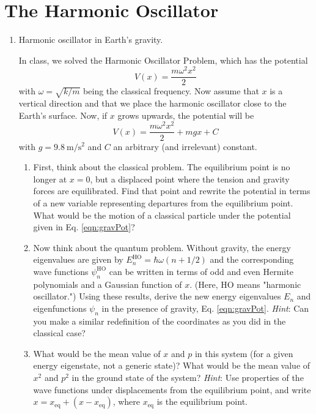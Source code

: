 \documentclass[../psets.tex]{subfiles}
\begin{document}
\section{The Harmonic Oscillator}
\begin{enumerate}
    \item {}Harmonic oscillator in Earth's gravity.\par
    In class, we solved the Harmonic Oscillator Problem, which has the potential
    \begin{equation}
        V(x) = \frac{m\omega^2x^2}{2}
    \end{equation}
    with $\omega=\sqrt{k/m}$ being the classical frequency. Now assume that $x$ is a vertical direction and that we place the harmonic oscillator close to the Earth's surface. Now, if $x$ grows upwards, the potential will be
    \begin{equation}\label{eqn:gravPot}
        V(x) = \frac{m\omega^2x^2}{2}+mgx+C
    \end{equation}
    with $g=\SI[per-mode=symbol]{9.8}{\meter\per\second\squared}$ and $C$ an arbitrary (and irrelevant) constant.
    \begin{enumerate}
        \item First, think about the classical problem. The equilibrium point is no longer at $x=0$, but a displaced point where the tension and gravity forces are equilibrated. Find that point and rewrite the potential in terms of a new variable representing departures from the equilibrium point. What would be the motion of a classical particle under the potential given in Eq. \ref{eqn:gravPot}?
        \item Now think about the quantum problem. Without gravity, the energy eigenvalues are given by $E_n^\text{HO}=\hbar\omega(n+1/2)$ and the corresponding wave functions $\psi_n^\text{HO}$ can be written in terms of odd and even Hermite polynomials and a Gaussian function of $x$. (Here, HO means "harmonic oscillator.") Using these results, derive the new energy eigenvalues $E_n$ and eigenfunctions $\psi_n$ in the presence of gravity, Eq. \ref{eqn:gravPot}. \emph{Hint}: Can you make a similar redefinition of the coordinates as you did in the classical case?
        \item What would be the mean value of $x$ and $p$ in this system (for a given energy eigenstate, not a generic state)? What would be the mean value of $x^2$ and $p^2$ in the ground state of the system? \emph{Hint}: Use properties of the wave functions under displacements from the equilibrium point, and write $x=x_\text{eq}+(x-x_\text{eq})$, where $x_\text{eq}$ is the equilibrium point.

\end{enumerate}
\end{enumerate}
\end{document}
